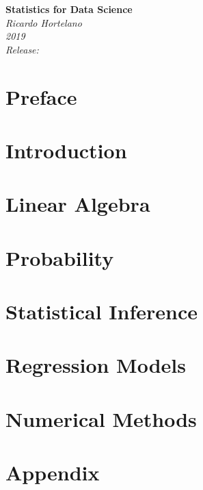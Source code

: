 \documentclass[12pt]{book}
\begin{document}
\begin{titlepage}
    \begin{center}
       \Large\textbf{Statistics for Data Science}\\
       \large\textit{Ricardo Hortelano}\\
       \textit{2019}\\
       \vspace*{3\baselineskip}
       \textit{Release:}\\
       \textit{}
    \end{center}
 \end{titlepage}

\listoftodos
\tableofcontents

\chapter*{Preface}


\chapter*{Introduction}


\chapter{Linear Algebra}


\chapter{Probability}


\chapter{Statistical Inference}


\chapter{Regression Models}


\chapter{Numerical Methods}


\appendix
\chapter{Appendix}


\printbibliography
\end{document}
